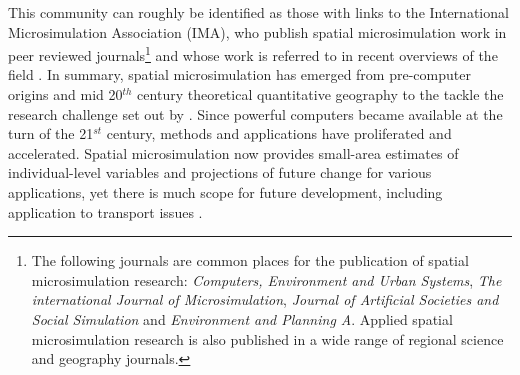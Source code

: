 This community can roughly be identified as those with links
to the International Microsimulation Association (IMA), 
who publish spatial microsimulation work in peer reviewed
journals\footnote{The following journals are common places for the
publication of spatial microsimulation research:
\emph{Computers, Environment and Urban Systems},
\emph{The international Journal of Microsimulation},
\emph{Journal of Artificial Societies and Social Simulation} and
\emph{Environment and Planning A}. Applied spatial microsimulation
research is also published in a wide range of regional science
and geography journals.
}
and whose work is referred to in recent overviews of the field
\citep{Tanton2013, O'Donoghue2013}.
In summary, spatial microsimulation has emerged
from pre-computer origins and mid 20$^{th}$ century theoretical quantitative
geography to the tackle the research challenge set out by
\citet{Holm1987}. Since powerful computers became available at the turn
of the 21$^{st}$ century, methods and applications have
proliferated and accelerated. Spatial microsimulation now
provides small-area estimates
of individual-level variables and projections of future change
for various applications, yet there is much scope for
future development, including application to transport issues
\citep{Clarke2013-concs}.

